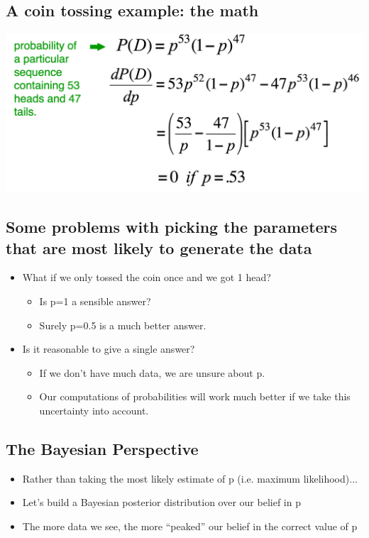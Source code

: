 \documentclass[11pt]{article}
\theoremstyle{definition}
\begin{document}
\subsection{A coin tossing example: the math}
\includegraphics[width=\textwidth]{4.png}

\subsection{Some problems with picking the parameters that
are most likely to generate the data}
\begin{itemize}
    \item What if we only
    tossed the coin once
    and we got 1 head?
    \begin{itemize}
        \item Is p=1 a sensible
        answer?
        \item Surely p=0.5 is a
        much better
        answer.
    \end{itemize}
    \item Is it reasonable to give a single
    answer?
    \begin{itemize}
        \item If we don’t have much data,
        we are unsure about p.
        \item Our computations of
        probabilities will work much
        better if we take this
        uncertainty into account.
    \end{itemize}
\end{itemize}

\subsection{The Bayesian Perspective}
\begin{itemize}
    \item Rather than taking the
    most likely estimate of p
    (i.e. maximum
    likelihood)...
    \item Let’s build a Bayesian
    posterior distribution
    over our belief in p
    \item The more data we see,
    the more “peaked” our
    belief in the correct
    value of p
\end{itemize}
\end{document}
